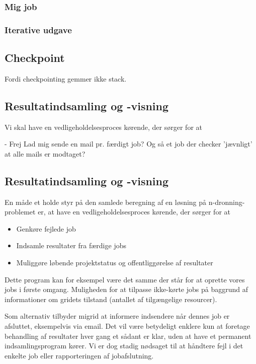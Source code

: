 \documentclass[draft,a4paper,10pt]{article}
\begin{document}
\subsubsection{Mig job}\label{label}
\subsubsection{Iterative udgave}
\subsection{Checkpoint}

Fordi checkpointing gemmer ikke stack.


\subsection{Resultatindsamling og -visning}
Vi skal have en vedligeholdelsesproces kørende, der sørger for at 

- Frej Lad mig sende en mail pr. færdigt job? Og så et job der checker 'jævnligt' at alle mails er modtaget?


\subsection{Resultatindsamling og -visning}
En måde et holde styr på den samlede beregning af en løsning på n-dronning-problemet er, at have en vedligeholdelsesproces kørende, der sørger for at 
\begin{itemize}
	\item Genkøre fejlede job
	\item Indsamle resultater fra færdige jobs
	\item Muliggøre løbende projektstatus og offentliggørelse af resultater 
\end{itemize}
Dette program kan for eksempel være det samme der står for at oprette vores jobs i første omgang. Muligheden for at tilpasse ikke-kørte jobs på baggrund af informationer om gridets tilstand (antallet af tilgængelige resourcer). 

Som alternativ tilbyder migrid at informere indsendere når dennes job er afsluttet, eksempelvis via email. Det vil være betydeligt enklere kun at foretage behandling af resultater hver gang et sådant er klar, uden at have et permanent indsamlingsprogram kører. Vi er dog stadig nødsaget til at håndtere fejl i det enkelte job eller rapporteringen af jobafslutning. 
\end{document}
